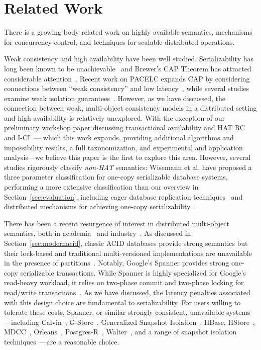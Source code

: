 
\section{Related Work}
\label{sec:relatedwork}

There is a growing body related work on highly available semantics,
mechanisms for concurrency control, and techniques for scalable
distributed operations.

Weak consistency and high availability have been well
studied. Serializability has long been known to be
unachievable~\cite{davidson-survey} and Brewer's CAP Theorem has
attracted considerable attention~\cite{gilbert-cap}. Recent work on
PACELC expands CAP by considering connections between ``weak
consistency'' and low latency~\cite{abadi-pacelc}, while several
studies examine weak isolation guarantees~\cite{adya,
  ansicritique}. However, as we have discussed, the connection between
weak, multi-object consistency models in a distributed setting and
high availability is relatively unexplored. With the exception of our
preliminary workshop paper discussing transactional availability and
HAT RC and I-CI~\cite{hat-hotos}--- which this work expands, providing
additional algorithms and impossibility results, a full
taxonomization, and experimental and application analysis---we believe
this paper is the first to explore this area. However, several studies
rigorously classify \textit{non-HAT} semantics: Wisemann et al. have
proposed a three parameter classification for one-copy serializable
database systems, performing a more extensive classification than our
overview in Section~\ref{sec:evaluation}, including eager database
replication techniques~\cite{kemme-classification} and distributed
mechanisms for achieving one-copy
serializability~\cite{wisemann-survey}.


There has been a recent resurgence of interest in distributed
multi-object semantics, both in academia~\cite{kraska-s3, gstore,
  mdcc, eiger, walter,calvin, swift} and industry~\cite{orleans,
  spanner}. As discussed in Section~\ref{sec:modernacid}, classic ACID
databases provide strong semantics but their lock-based and
traditional multi-versioned implementations are unavailable in the
presence of partitions~\cite{bernstein-book, gray-isolation}. Notably,
Google's Spanner provides strong one-copy serializable
transactions. While Spanner is highly specialized for Google's
read-heavy workload, it relies on two-phase commit and two-phase
locking for read/write transactions~\cite{spanner}. As we have
discussed, the latency penalties associated with this design choice
are fundamental to serializability. For users willing to tolerate
these costs, Spanner, or similar strongly consistent, unavailable
systems---including Calvin~\cite{calvin}, G-Store~\cite{gstore},
Generalized Snapshot Isolation~\cite{generalizedsnapshot}, HBase,
HStore~\cite{hstore}, MDCC~\cite{mdcc}, Orleans~\cite{orleans},
Postgres-R~\cite{kemme-thesis}, Walter~\cite{walter}, and a range of
snapshot isolation techniques~\cite{middleware-db, kemme-snapshot,
  daudjee-snapshot}---are a reasonable choice.

